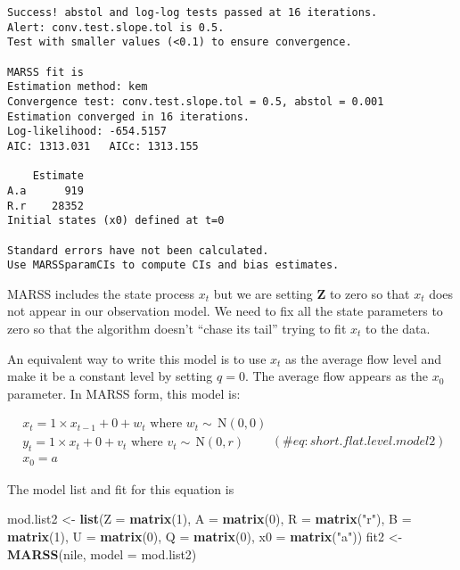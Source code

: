 \documentclass[12pt,]{book}
\newenvironment{Shaded}{\begin{snugshade}}{\end{snugshade}}
\newcommand{\DataTypeTok}[1]{\textcolor[rgb]{0.13,0.29,0.53}{#1}}
\newcommand{\DecValTok}[1]{\textcolor[rgb]{0.00,0.00,0.81}{#1}}
\newcommand{\KeywordTok}[1]{\textcolor[rgb]{0.13,0.29,0.53}{\textbf{#1}}}
\newcommand{\NormalTok}[1]{#1}
\newcommand{\StringTok}[1]{\textcolor[rgb]{0.31,0.60,0.02}{#1}}
\begin{document}
\begin{verbatim}
Success! abstol and log-log tests passed at 16 iterations.
Alert: conv.test.slope.tol is 0.5.
Test with smaller values (<0.1) to ensure convergence.

MARSS fit is
Estimation method: kem 
Convergence test: conv.test.slope.tol = 0.5, abstol = 0.001
Estimation converged in 16 iterations. 
Log-likelihood: -654.5157 
AIC: 1313.031   AICc: 1313.155   
 
    Estimate
A.a      919
R.r    28352
Initial states (x0) defined at t=0

Standard errors have not been calculated. 
Use MARSSparamCIs to compute CIs and bias estimates.
\end{verbatim}

MARSS includes the state process \(x_t\) but we are setting \(\mathbf{Z}\) to zero so that \(x_t\) does not appear in our observation model. We need to fix all the state parameters to zero so that the algorithm doesn't ``chase its tail'' trying to fit \(x_t\) to the data.

An equivalent way to write this model is to use \(x_t\) as the average flow level and make it be a constant level by setting \(q=0\). The average flow appears as the \(x_0\) parameter. In MARSS form, this model is:

\begin{equation}
\begin{gathered}
x_t = 1 \times x_{t-1}+ 0 + w_t    \text{ where } w_t \sim \,\text{N}(0,0) \\
y_t = 1 \times x_t + 0 + v_t \text{ where } v_t \sim \,\text{N}(0,r)  \\
x_0 = a 
 \end{gathered}   
(\#eq:short.flat.level.model2)
\end{equation}

The model list and fit for this equation is

\begin{Shaded}
\begin{Highlighting}[]
\NormalTok{mod.list2 <-}\StringTok{ }\KeywordTok{list}\NormalTok{(}\DataTypeTok{Z =} \KeywordTok{matrix}\NormalTok{(}\DecValTok{1}\NormalTok{), }\DataTypeTok{A =} \KeywordTok{matrix}\NormalTok{(}\DecValTok{0}\NormalTok{), }\DataTypeTok{R =} \KeywordTok{matrix}\NormalTok{(}\StringTok{"r"}\NormalTok{), }
    \DataTypeTok{B =} \KeywordTok{matrix}\NormalTok{(}\DecValTok{1}\NormalTok{), }\DataTypeTok{U =} \KeywordTok{matrix}\NormalTok{(}\DecValTok{0}\NormalTok{), }\DataTypeTok{Q =} \KeywordTok{matrix}\NormalTok{(}\DecValTok{0}\NormalTok{), }\DataTypeTok{x0 =} \KeywordTok{matrix}\NormalTok{(}\StringTok{"a"}\NormalTok{))}
\NormalTok{fit2 <-}\StringTok{ }\KeywordTok{MARSS}\NormalTok{(nile, }\DataTypeTok{model =}\NormalTok{ mod.list2)}
\end{Highlighting}
\end{Shaded}
\end{document}

